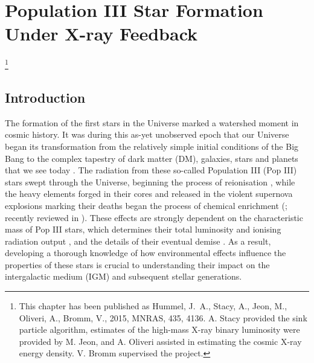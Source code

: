 \documentclass[../thesis.tex]{subfiles}
\begin{document}
\chapter{Population III Star Formation Under X-ray Feedback}\footnote{This chapter has been published as Hummel, J.~A., Stacy, A., Jeon, M., Oliveri, A., Bromm, V., 2015, MNRAS, 435, 4136.  A. Stacy provided the sink particle algorithm, estimates of the high-mass X-ray binary luminosity were provided by M. Jeon, and A. Oliveri assisted in estimating the cosmic X-ray energy density. V. Bromm supervised the project.}
\section{Introduction}
\label{intro}
The formation of the first stars in the Universe marked a watershed moment in cosmic history.  It was during this as-yet unobserved epoch that our Universe began its transformation from the relatively simple initial conditions of the Big Bang to the complex tapestry of dark matter (DM), galaxies, stars and planets that we see today \citep{BarkanaLoeb2001, Miralda-Escude2003, Brommetal2009, Loeb2010}.  The radiation from these so-called Population III (Pop III) stars swept through the Universe, beginning the process of reionisation \citep{Kitayamaetal2004, Sokasianetal2004, WhalenAbelNorman2004, AlvarezBrommShapiro2006, JohnsonGreifBromm2007, Robertsonetal2010}, while the heavy elements forged in their cores and released in the violent supernova explosions marking their deaths began the process of chemical enrichment (\citealt{MadauFerraraRees2001, MoriFerraraMadau2002, BrommYoshidaHernquist2003, Hegeretal2003, UmedaNomoto2003, TornatoreFerraraSchneider2007, Greifetal2007, Greifetal2010, WiseAbel2008, Maioetal2011}; recently reviewed in \citealt{KarlssonBrommHawthorn2013}). These effects are strongly dependent on the characteristic mass of Pop III stars, which determines their total luminosity and ionising radiation output \citep{Schaerer2002}, and the details of their eventual demise \citep{Hegeretal2003, HegerWoosley2010, MaederMeynet2012}. As a result, developing a thorough knowledge of how environmental effects influence the properties of these stars is crucial to understanding their impact on the intergalactic medium (IGM) and subsequent stellar generations.
\end{document}
